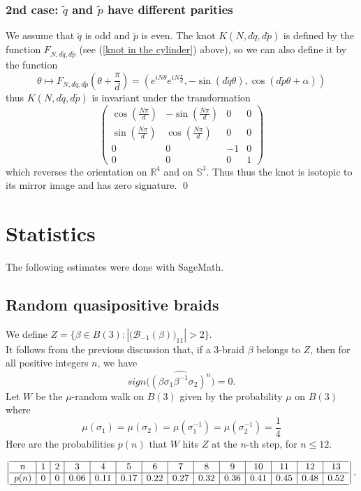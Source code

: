 \documentclass[12pt]{article}
\begin{document}
\subsubsection{2nd case: $\tilde{q}$ and $\tilde{p}$ have different parities}
We assume that $\tilde{q}$ is odd and $\tilde{p}$ is even.
The knot $K(N,d\tilde{q},d\tilde{p})$ is defined by  
	 the function $F_{N,d\tilde{q},d\tilde{p}}$ (see (\ref{knot in the cylinder}) above), so we can also define it by the function
	 $$\theta\mapsto F_{N,d\tilde{q},d\tilde{p}}(\theta+\frac{\pi}{d})=
	 (e^{iN\theta}e^{iN\frac{\pi}{d}},-\sin(d\tilde{q}\theta),\cos(d\tilde{p}\theta+\alpha))$$
	 thus $K(N,d\tilde{q},d\tilde{p})$ is invariant under the transformation
	 \begin{equation}\label{grosse matrice}
	 \begin{pmatrix}
	 \cos(\frac{N\pi}{d}) & -\sin(\frac{N\pi}{d}) & 0 & 0\\
	 \sin(\frac{N\pi}{d}) & \cos(\frac{N\pi}{d}) & 0 & 0\\
	 0 & 0 & -1 & 0\\ 
	 0 & 0 & 0 & 1
	 \end{pmatrix}
	 \end{equation}
	 which reverses the orientation on $\mathbb{R}^4$ and on $\mathbb{S}^3$. Thus thus the knot is isotopic to its mirror image and  has zero signature. \qed
	 
	 

	 \section{Statistics}
	 The following estimates were done with SageMath.
	 \subsection{Random quasipositive braids}
	  We define $Z=\{\beta\in B(3): |\big({\mathcal B}_{-1}(\beta)\big)_{11}|> 2\}.$	\\  It follows from the previous discussion that, if a $3$-braid $\beta$ belongs to $Z$, then for all positive integers $n$, we have  $$sign\Big(\widehat{(\beta\sigma_1\beta^{-1}\sigma_2)^n}\Big)=0.$$
	 Let $W$ be the $\mu$-random walk on $B(3)$  given by the probability $\mu$ on $B(3)$ where
	 $$\mu(\sigma_1)= \mu(\sigma_2)=\mu(\sigma_1^{-1})= 
	 \mu(\sigma_2^{-1})=\frac{1}{4}$$
Here are the probabilities $p(n)$  that $W$ hits $Z$ at the $n$-th step, for $n\leq 12$.  
	 
	 \[ \left| \begin{array}
	 { c | c | c | c | c | c | c | c| c | c | c |c|c|c}	
	
	 \hline
	n& 1 &  2 & 3  & 4 & 5 & 6 & 7 & 8 & 9 & 10 & 11&12&13\\
	\hline 
	p(n) & 0 &  0 & 0.06  & 0.11 & 0.17 & 0.22 & 0.27 & 0.32 & 0.36 & 0.41 & 0.45&0.48&0.52\\
	 \hline
	 \end{array} \right|.\]
	 
\end{document}

